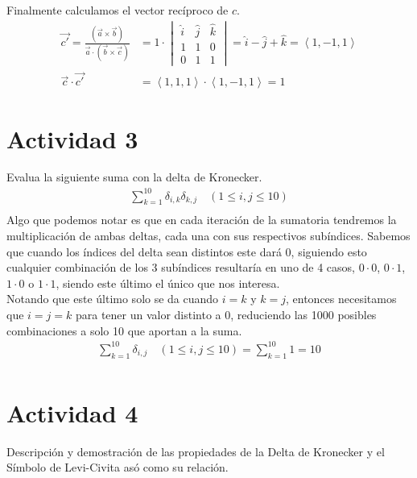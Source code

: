 \documentclass{article}
\newcommand{\custvec}[1]{\left\langle#1\right\rangle}
\begin{document}
Finalmente calculamos el vector recíproco de $c$.
\begin{equation*}
    \begin{split}
        \vec{c'} = \frac{(\vec{a}\times \vec{b})}{\vec{a}\cdot (\vec{b}\times \vec{c})} &= 1\cdot \begin{vmatrix}
        \hat{i} & \hat{j} & \hat{k} \\
        1 & 1 & 0 \\
        0 & 1 & 1
        \end{vmatrix} = \hat{i} - \hat{j} + \hat{k} = \custvec{1,-1,1}\\
        \vec{c}\cdot \vec{c'} &= \custvec{1,1,1}\cdot \custvec{1,-1,1} = 1 
    \end{split}
\end{equation*}
\newpage
\section{Actividad 3}
Evalua la siguiente suma con la delta de Kronecker.\\
\begin{equation*}
    \begin{split}
       \sum\limits_{k=1}^{10} \delta_{i,k}\delta_{k,j}\quad(1\leq i,j \leq 10)\\
    \end{split}
\end{equation*}
Algo que podemos notar es que en cada iteración de la sumatoria tendremos la multiplicación de ambas deltas, cada una con sus respectivos subíndices. Sabemos que cuando los índices del delta sean distintos este dará 0, siguiendo esto cualquier combinación de los 3 subíndices resultaría en uno de 4 casos, $0\cdot 0$, $0\cdot 1$, $1\cdot 0$ o $1\cdot1$, siendo este último el único que nos interesa.\\

Notando que este último solo se da cuando $i=k$ y $k=j$, entonces necesitamos que $i=j=k$ para tener un valor distinto a 0, reduciendo las 1000 posibles combinaciones a solo 10 que aportan a la suma.\\
\begin{equation*}
    \begin{split}
       \sum\limits_{k=1}^{10}\delta_{i,j}\quad (1\leq i,j \leq 10) = \sum\limits_{k=1}^{10}1 = 10\\
    \end{split}
\end{equation*}
\newpage
\section{Actividad 4}
Descripción y demostración de las propiedades de la Delta de Kronecker y el Símbolo de Levi-Civita asó como su relación.
\newpage
\end{document}
